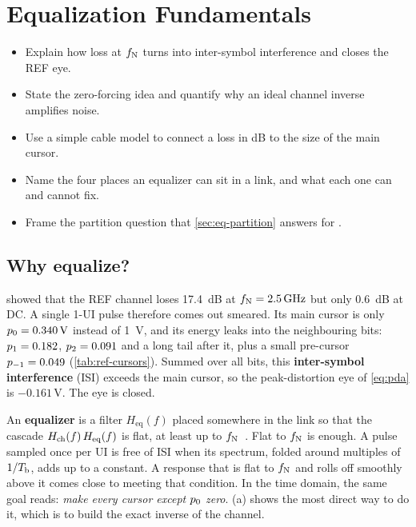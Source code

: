\chapter{Equalization Fundamentals}\label{ch:eqfund}
\suppressfloats[t]

\begin{objectives}
\begin{itemize}
  \item Explain how loss at $f_\mathrm{N}$ turns into inter-symbol interference and closes the REF eye.
  \item State the zero-forcing idea and quantify why an ideal channel inverse amplifies noise.
  \item Use a simple cable model to connect a loss in dB to the size of the main cursor.
  \item Name the four places an equalizer can sit in a link, and what each one can and cannot fix.
  \item Frame the partition question that \cref{sec:eq-partition} answers for \OS{}.
\end{itemize}
\end{objectives}

\section{Why equalize?}\label{sec:ch5-why}

 showed that the REF channel loses \qty{17.4}{\deci\bel} at $f_\mathrm{N}=\qty{2.5}{\giga\hertz}$ but only \qty{0.6}{\deci\bel} at DC. A single 1-UI pulse therefore comes out smeared. Its main cursor is only $p_{0}=\qty{0.340}{\volt}$ instead of \qty{1}{\volt}, and its energy leaks into the neighbouring bits: $p_{1}=0.182$, $p_{2}=0.091$ and a long tail after it, plus a small pre-cursor $p_{-1}=0.049$ (\cref{tab:ref-cursors}). Summed over all bits, this \textbf{inter-symbol interference} (ISI) exceeds the main cursor, so the peak-distortion eye of \cref{eq:pda} is $-0.161$\,V. The eye is closed.

An \textbf{equalizer} is a filter $H_\mathrm{eq}(f)$ placed somewhere in the link so that the cascade $H_\mathrm{ch}(f)\,H_\mathrm{eq}(f)$ is flat, at least up to $f_\mathrm{N}$~\cite{palermo720eq}. Flat to $f_\mathrm{N}$ is enough. A pulse sampled once per UI is free of ISI when its spectrum, folded around multiples of $1/T_\mathrm{b}$, adds up to a constant. A response that is flat to $f_\mathrm{N}$ and rolls off smoothly above it comes close to meeting that condition. In the time domain, the same goal reads: \emph{make every cursor except $p_{0}$ zero}. (a) shows the most direct way to do it, which is to build the exact inverse of the channel.

